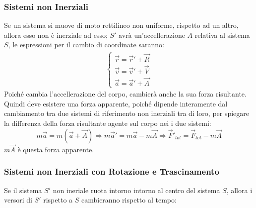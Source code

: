 \documentclass{article}
\numberwithin{equation}{subsection}
\begin{document}
\subsubsection{Sistemi non Inerziali}
Se un sistema si muove di moto rettilineo non uniforme, 
rispetto ad un altro, allora esso non è inerziale ad esso; 
$S'$ avrà un'accellerazione $A$ relativa al sistema $S$, 
le espressioni per il cambio di coordinate saranno:
\begin{gather}
    \begin{cases}
        \vec{r}=\vec{r}'+\vec{R}\\
        \vec{v}=\vec{v}'+\vec{V}\\
        \vec{a}=\vec{a}'+\vec{A}
    \end{cases}
\end{gather}
Poiché cambia l'accellerazione del corpo, cambierà anche 
la sua forza risultante.
Quindi deve esistere una forza apparente, poiché dipende 
interamente dal cambiamento tra due sistemi di riferimento 
non inerziali tra di loro, per spiegare la differenza della 
forza risultante agente sul corpo nei i due sistemi:
\begin{equation}
    m\vec{a}=m(\vec{a}+\vec{A})\Rightarrow m\vec{a}'=m\vec{a}-m\vec{A}\Rightarrow\vec{F}'_{tot}=\vec{F}_{tot}-m\vec{A}
\end{equation}
$m\vec{A}$ è questa forza apparente.

\subsubsection{Sistemi non Inerziali con Rotazione e Trascinamento}
Se il sistema $S'$ non ineriale ruota intorno intorno al centro del 
sistema $S$, allora i versori di $S'$ rispetto a $S$ 
cambieranno rispetto al tempo:
\end{document}
